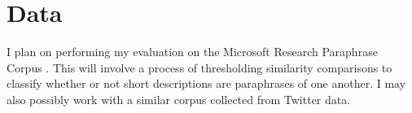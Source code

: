 \documentclass{sig-alternate-05-2015}
\begin{document}

\section{Data}
I plan on performing my evaluation on the Microsoft Research Paraphrase Corpus \cite{MSRParaphrase}. This will involve a process of thresholding similarity comparisons to classify whether or not short descriptions are paraphrases of one another. I may also possibly work with a similar corpus collected from Twitter data\cite{Twitter}.



\end{document}
